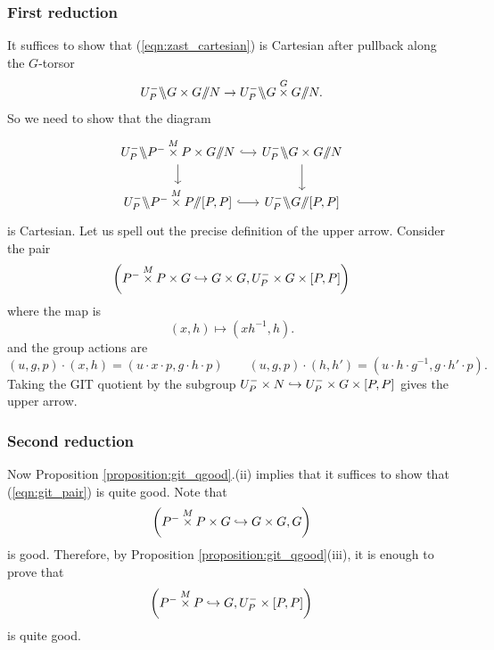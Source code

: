 \subsubsection{First reduction} It suffices to show that (\ref{eqn:zast_cartesian}) is Cartesian after pullback along the $G$-torsor
  \[U_P^- \bss G \times G \git N \to U_P^- \bss G \overset{G}{\times} G \git N.\]
So we need to show that the diagram
\[
\begin{tikzcd}[
  column sep={10em,between origins},
  row sep={4em,between origins}
]
  U_P^- \bss P^- \overset{M}{\times} P \times G \git N \arrow[r, hook] \arrow[d] & U_P^- \bss G \times G \git N \arrow[d] \\
  U_P^- \bss P^- \overset{M}{\times} P \git [P,P] \arrow[r, hook] & U_P^- \bss G \git [P,P]
\end{tikzcd}
\]
is Cartesian. Let us spell out the precise definition of the upper arrow. Consider the pair
\begin{equation}
\label{eqn:git_pair}
    \left(P^- \overset{M}{\times} P \times G \hookrightarrow G \times G, U_P^- \times G \times [P,P] \right)    
\end{equation}
where the map is
    \[(x, h) \mapsto (x h^{-1}, h).\]
and the group actions are
    \[
    (u, g, p) \cdot (x, h) = (u \cdot x \cdot p, g \cdot h \cdot p)
    \qquad
    (u, g, p) \cdot (h, h') = (u \cdot h \cdot g^{-1}, g \cdot h' \cdot p).
    \]
Taking the GIT quotient by the subgroup $U_P^- \times N \hookrightarrow U_P^- \times G \times [P,P]$ gives the upper arrow.

\subsubsection{Second reduction} Now Proposition \ref{proposition:git_qgood}.(ii) implies that it suffices to show that (\ref{eqn:git_pair}) is quite good. Note that
    \[
    \left(P^- \overset{M}{\times} P \times G \hookrightarrow G \times G, G \right)
    \]
is good. Therefore, by Proposition \ref{proposition:git_qgood}(iii), it is enough to prove that
    \[
    \left(P^- \overset{M}{\times} P \hookrightarrow G, U_P^- \times [P,P] \right)
    \]
is quite good. 

